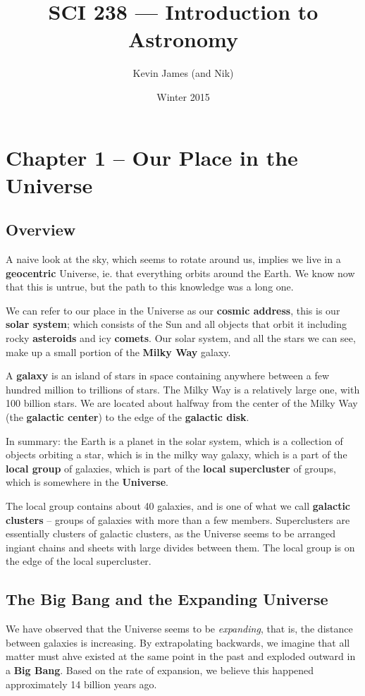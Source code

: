 \documentclass[12pt]{article}
\begin{document}
\title{SCI 238 --- Introduction to Astronomy}
\author{Kevin James (and Nik)}
\date{\vspace{-2ex}Winter 2015}
\maketitle\HRule

\tableofcontents
\newpage

\section{Chapter 1 -- Our Place in the Universe}
\subsection{Overview}
A naive look at the sky, which seems to rotate around us, implies we live in a {\bf geocentric} Universe, ie. that everything orbits around the Earth. We know now that this is untrue, but the path to this knowledge was a long one.

We can refer to our place in the Universe as our {\bf cosmic address}, this is our {\bf solar system}; which consists of the Sun and all objects that orbit it including rocky {\bf asteroids} and icy {\bf comets}. Our solar system, and all the stars we can see, make up a small portion of the {\bf Milky Way} galaxy.

A {\bf galaxy} is an island of stars in space containing anywhere between a few hundred million to trillions of stars. The Milky Way is a relatively large one, with 100 billion stars. We are located about halfway from the center of the Milky Way (the {\bf galactic center}) to the edge of the {\bf galactic disk}.

In summary: the Earth is a planet in the solar system, which is a collection of objects orbiting a star, which is in the milky way galaxy, which is a part of the {\bf local group} of galaxies, which is part of the {\bf local supercluster} of groups, which is somewhere in the {\bf Universe}.

The local group contains about 40 galaxies, and is one of what we call {\bf galactic clusters} -- groups of galaxies with more than a few members. Superclusters are essentially clusters of galactic clusters, as the Universe seems to be arranged ingiant chains and sheets with large divides between them. The local group is on the edge of the local supercluster.

\subsection{The Big Bang and the Expanding Universe}
We have observed that the Universe seems to be \emph{expanding}, that is, the distance between galaxies is increasing. By extrapolating backwards, we imagine that all matter must ahve existed at the same point in the past and exploded outward in a {\bf Big Bang}. Based on the rate of expansion, we believe this happened approximately 14 billion years ago.
\end{document}
